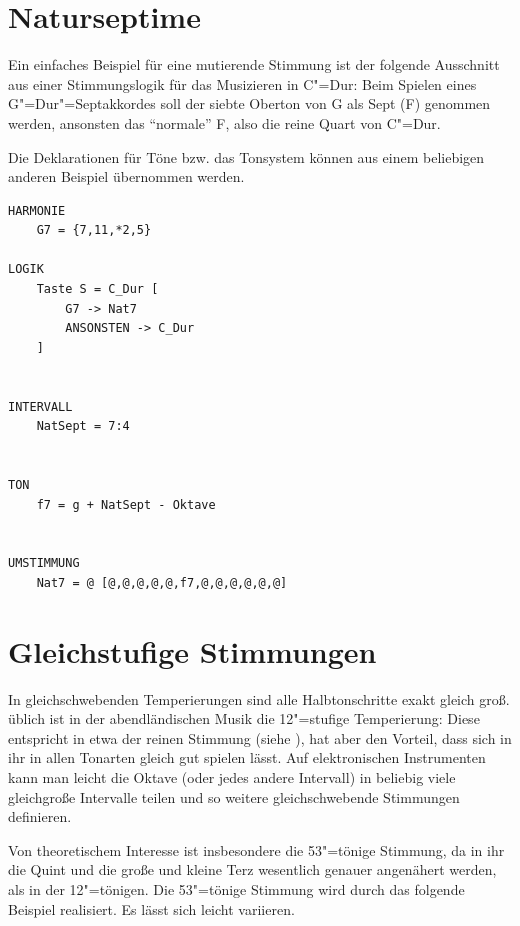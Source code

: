 {
\section{Naturseptime}
\label{sec:EX_NATSEVEN}

Ein einfaches Beispiel für eine mutierende Stimmung ist der 
folgende Ausschnitt aus einer Stimmungslogik für das Musizieren 
in C"=Dur: Beim Spielen eines G"=Dur"=Septakkordes soll der siebte 
Oberton von G als Sept (F) genommen werden, ansonsten das "`normale"'
F, also die reine Quart von C"=Dur. 

Die Deklarationen für Töne bzw. das Tonsystem  können 
aus einem beliebigen anderen Beispiel übernommen werden.


\begin{verbatim}
HARMONIE 
    G7 = {7,11,*2,5}

LOGIK 
    Taste S = C_Dur [
        G7 -> Nat7 
        ANSONSTEN -> C_Dur 
    ]


INTERVALL 
    NatSept = 7:4


TON
    f7 = g + NatSept - Oktave


UMSTIMMUNG 
    Nat7 = @ [@,@,@,@,@,f7,@,@,@,@,@,@]
\end{verbatim}

\section{Gleichstufige Stimmungen}
\label{sec:EX_EQUAL}

In gleichschwebenden Temperierungen sind alle Halbtonschritte 
exakt gleich groß. üblich ist in der abendländischen Musik 
die 12"=stufige Temperierung: Diese entspricht in etwa der reinen 
Stimmung (siehe ), hat aber den Vorteil, 
dass sich in ihr in allen Tonarten gleich gut spielen lässt. 
Auf elektronischen Instrumenten kann man leicht die Oktave (oder 
jedes andere Intervall) in beliebig viele gleichgroße Intervalle 
teilen und so weitere gleichschwebende Stimmungen definieren.


Von theoretischem Interesse ist insbesondere die 53"=tönige 
Stimmung, da in ihr die Quint und die große und kleine Terz 
wesentlich genauer angenähert werden, als in der 12"=tönigen. 
Die 53"=tönige Stimmung wird durch 
das folgende Beispiel realisiert. Es lässt sich leicht variieren.

}
